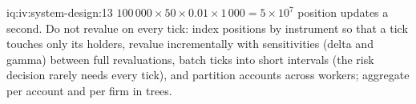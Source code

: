 \begin{solution}{iq:iv:system-design:13}
$100\,000 \times 50 \times 0.01 \times 1\,000 = 5 \times 10^7$ position updates a second. Do not revalue on every tick: index
positions by instrument so that a tick touches only its holders, revalue incrementally with sensitivities (delta and gamma) between
full revaluations, batch ticks into short intervals (the risk decision rarely needs every tick), and partition accounts across
workers; aggregate per account and per firm in trees.
\end{solution}

